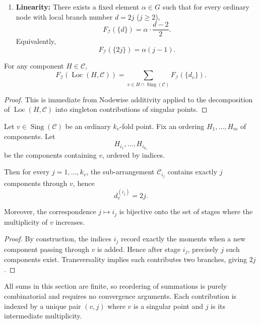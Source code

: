 \documentclass[article,11pt]{amsart} \numberwithin{equation}{section}
\numberwithin{equation}{section}
\begin{document}
{\begin{df}
\begin{enumerate}
		\item \textbf{Linearity:} There exists a fixed element \(\alpha \in G\) such that for every ordinary node with local branch number \(d=2j\) (\(j\ge 2\)),
		\[
		F_{\mathcal I}(\{d\})=\alpha\cdot \frac{d-2}{2}.
		\]
		Equivalently,
		\[
		F_{\mathcal I}(\{2j\})=\alpha (j-1).
		\]
	\end{enumerate}
\end{df}

\begin{lm}
	\label{lem:nodewise_decomp_app}
	For any component \(H\in\mathcal C\),
	\[
	F_{\mathcal I}(\operatorname{Loc}(H,\mathcal C))=\sum_{v\in H\cap\operatorname{Sing}(\mathcal C)} F_{\mathcal I}(\{d_v\}).
	\]
\end{lm}

\begin{proof}
	This is immediate from Nodewise additivity applied to the decomposition of \(\operatorname{Loc}(H,\mathcal C)\) into singleton contributions of singular points.
\end{proof}

\begin{lm}
	\label{lem:multiplicity_evol_app}
	Let \(v\in\operatorname{Sing}(\mathcal C)\) be an ordinary \(k_v\)-fold point. Fix an ordering \(H_1,\dots,H_m\) of components. Let
	\[
	H_{i_1},\dots,H_{i_{k_v}}
	\]
	be the components containing \(v\), ordered by indices.
	
	Then for every \(j=1,\dots,k_v\), the sub-arrangement \(\mathcal C_{i_j}\) contains exactly \(j\) components through \(v\), hence
	\[
	d_v^{(i_j)}=2j.
	\]
	
	Moreover, the correspondence \(j\longmapsto i_j\) is bijective onto the set of stages where the multiplicity of \(v\) increases.
\end{lm}

\begin{proof}
	By construction, the indices \(i_j\) record exactly the moments when a new component passing through \(v\) is added. Hence after stage \(i_j\), precisely \(j\) such components exist. Transversality implies each contributes two branches, giving \(2j\).
\end{proof}

\begin{rk}
	All sums in this section are finite, so reordering of summations is purely combinatorial and requires no convergence arguments. Each contribution is indexed by a unique pair \((v,j)\) where \(v\) is a singular point and \(j\) is its intermediate multiplicity.
\end{rk}

}
\end{document}
